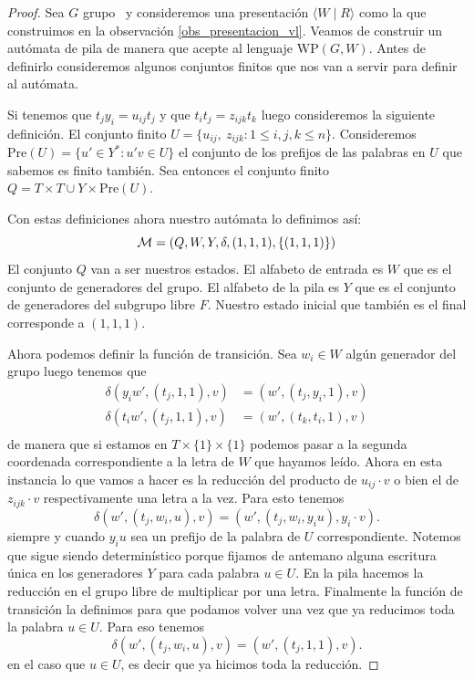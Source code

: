 \documentclass[tesis.tex]{subfiles}
\begin{document}
 
\begin{proof}
	Sea $G$ grupo \vl  \ y consideremos una presentación $\langle W  \mid  R \rangle$ como la que construimos en la observación \ref{obs_presentacion_vl}.
	Veamos de construir un autómata de pila de manera que acepte al lenguaje $\text{WP}(G,W)$.
	Antes de definirlo consideremos algunos conjuntos finitos que nos van a servir para definir al autómata.
	
	Si tenemos que $ t_j y_i = u_{ij} t_j $ y que $ t_it_j = z_{ijk}t_k $ luego consideremos la siguiente definición.
	El conjunto finito $U = \{ u_{ij}, \ z_{ijk} : 1 \le i,j,k \le n \}$.
	Consideremos $\text{Pre}(U) = \{ u' \in Y^* : u'v \in U  \}$ el conjunto de los prefijos de las palabras en $U$ que sabemos es finito también.	
	Sea entonces el conjunto finito $Q = T \times T \cup Y \times \text{Pre}(U) $.
		
	Con estas definiciones ahora nuestro autómata lo definimos así: 
	\[
	{\cal M }= (Q, W , Y, \delta, (1,1,1), \{(1,1,1)\})
	\]
	El conjunto $Q$ van a ser nuestros estados.
	El alfabeto de entrada es $W$ que es el conjunto de generadores del grupo.
	El alfabeto de la pila es $Y$ que es el conjunto de generadores del subgrupo libre $F$.
	Nuestro estado inicial que también es el final corresponde a $(1,1,1)$.
		
	Ahora podemos definir la función de transición. 
	Sea $w_i \in W$ algún generador del grupo luego tenemos que
	\begin{align*}
		\delta(y_iw',(t_j,1,1), v) &= (w', (t_j,y_i,1), v) \\
		\delta(t_iw',(t_j,1,1), v) &= (w', (t_k,t_i,1), v) \\
	\end{align*}
	de manera que si estamos en $T \times \{ 1 \} \times \{ 1 \}$ podemos pasar a la segunda coordenada correspondiente a la letra de $W$ que hayamos leído.	
	Ahora en esta instancia lo que vamos a hacer es la reducción del producto de $u_{ij} \cdot v$ o bien el de $z_{ijk} \cdot v$ respectivamente una letra a la vez.
	Para esto tenemos
	\begin{equation*}
		\delta(w',(t_j,w_i,u), v) = (w', (t_j,w_i,y_iu), y_i \cdot v) .
	\end{equation*}
	siempre y cuando $y_iu$ sea un prefijo de la palabra de $U$ correspondiente.
	Notemos que sigue siendo determinístico porque fijamos de antemano alguna escritura única en los generadores $Y$ para cada palabra $u \in U$.
	En la pila hacemos la reducción en el grupo libre de multiplicar por una letra.
	Finalmente la función de transición la definimos para que podamos volver una vez que ya reducimos toda la palabra $u \in U$.
	Para eso tenemos 
	\begin{equation*}
		\delta(w',(t_j,w_i,u), v) = (w', (t_j,1,1), v).		
	\end{equation*}
	en el caso que $u \in U$, es decir que ya hicimos toda la reducción.
	

\end{proof}
\end{document}
